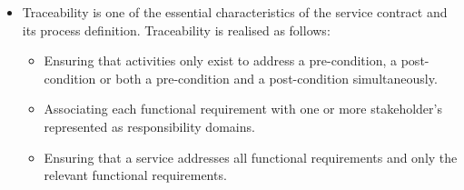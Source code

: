 \begin{itemize}
\begin{itemize}
\begin{itemize}
					\item Traceability is one of the essential characteristics of the service contract and its process definition. Traceability is realised as follows:
						\begin{itemize}
							\item Ensuring that activities only exist to address a pre-condition, a post-condition or both a pre-condition and a post-condition simultaneously.
							\item Associating each functional requirement with one or more stakeholder's represented as responsibility domains.
							\item Ensuring that a service addresses all functional requirements and only the relevant functional requirements.
						\end{itemize}
			\end{itemize}
		\end{itemize}
		

		
		

\end{itemize}
